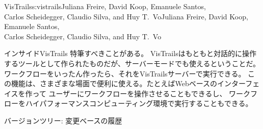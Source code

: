 \begin{aosachaptertoc}{VisTrails}{s:vistrails}{Juliana Freire, David Koop, Emanuele Santos, \\ Carlos Scheidegger, Claudio Silva, and Huy T.\ Vo}{Juliana Freire, David Koop, Emanuele Santos, \\ \hspace*{0.9cm} Carlos Scheidegger, Claudio Silva, and Huy T.\ Vo}
\begin{aosasect1}{インサイドVisTrails}
特筆すべきことがある。
VisTrailsはもともと対話的に操作するツールとして作られたものだが、サーバーモードでも使えるということだ。
ワークフローをいったん作ったら、それをVisTrailsサーバーで実行できる。
この機能は、さまざまな場面で便利に使える。たとえばWebベースのインターフェイスを作って
ユーザーにワークフローを操作させることもできるし、
ワークフローをハイパフォーマンスコンピューティング環境で実行することもできる。

\begin{aosasect2}{バージョンツリー: 変更ベースの履歴}



\end{aosasect2}
\end{aosasect1}
\end{aosachaptertoc}
